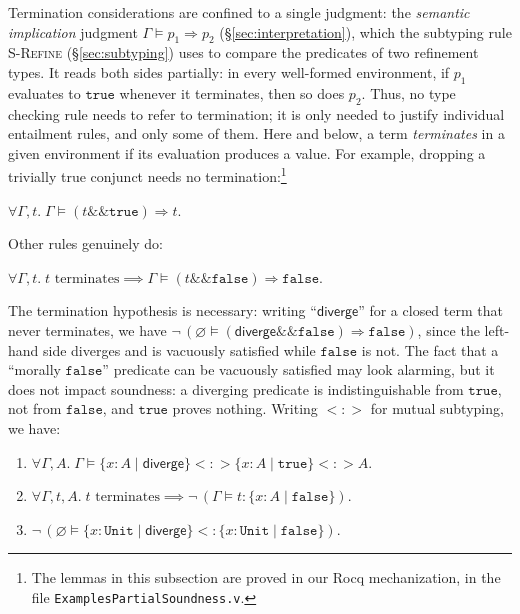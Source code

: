 \documentclass[acmsmall]{acmart}
\begin{document}
Termination considerations are confined to a single judgment: the \emph{semantic implication} judgment $\Gamma \vDash p_1 \Rightarrow p_2$ (\S\ref{sec:interpretation}), which the subtyping rule \textsc{S-Refine} (\S\ref{sec:subtyping}) uses to compare the predicates of two refinement types. It reads both sides partially: in every well-formed environment, if $p_1$ evaluates to $\texttt{true}$ whenever it terminates, then so does $p_2$. Thus, no type checking rule needs to refer to termination; it is only needed to justify individual entailment rules, and only some of them. Here and below, a term \emph{terminates} in a given environment if its evaluation produces a value. For example, dropping a trivially true conjunct needs no termination:\footnote{The lemmas in this subsection are proved in our Rocq mechanization, in the file \texttt{ExamplesPartialSoundness.v}.}

\begin{lemma}\label{lem:and-true}
  $\forall \Gamma, t. \;\Gamma \vDash (t \mathbin{\texttt{\&\&}} \texttt{true}) \Rightarrow t$.
\end{lemma}

\noindent Other rules genuinely do:

\begin{lemma}\label{lem:and-false}
  $\forall \Gamma, t. \; t \text{ terminates} \implies \Gamma \vDash (t \mathbin{\texttt{\&\&}} \texttt{false}) \Rightarrow \texttt{false}$.
\end{lemma}

\noindent The termination hypothesis is necessary: writing ``$\textsf{diverge}$'' for a closed term that never terminates, we have $\neg\,(\varnothing \vDash (\textsf{diverge} \mathbin{\texttt{\&\&}} \texttt{false}) \Rightarrow \texttt{false})$, since the left-hand side diverges and is vacuously satisfied while $\texttt{false}$ is not. The fact that a ``morally $\texttt{false}$'' predicate can be vacuously satisfied may look alarming, but it does not impact soundness: a diverging predicate is indistinguishable from $\texttt{true}$, not from $\texttt{false}$, and $\texttt{true}$ proves nothing. Writing ${<:>}$ for mutual subtyping, we have:

\begin{lemma}\label{lem:diverge-vacuous}
  \leavevmode
  \begin{enumerate}[nosep]
    \item $\forall \Gamma, A. \; \Gamma \vDash \{x : A \mid \textsf{diverge}\} \mathrel{<:>} \{x : A \mid \texttt{true}\} \mathrel{<:>} A$.
    \item $\forall \Gamma, t, A. \; t \text{ terminates} \implies \neg\,(\Gamma \vDash t : \{x : A \mid \texttt{false}\})$.
    \item $\neg\,(\varnothing \vDash \{x : \texttt{Unit} \mid \textsf{diverge}\} <: \{x : \texttt{Unit} \mid \texttt{false}\})$.
  \end{enumerate}
\end{lemma}
\end{document}
